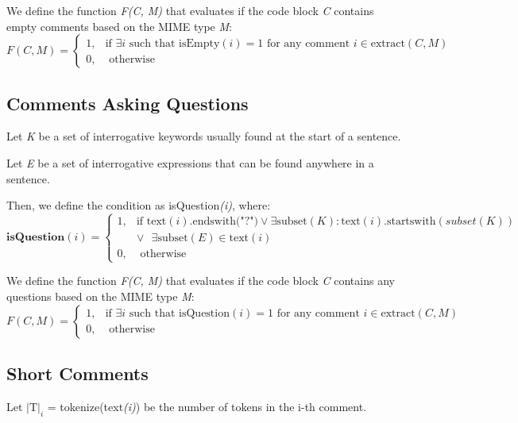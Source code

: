 \noindent We define the function \textit{F(C, M)} that evaluates if the code block \textit{C} contains empty comments based on the MIME type \textit{M}:
\begin{equation*}
	F(C, M) = \begin{cases}
		1, & \text{if } \exists i \text{ such that } \text{isEmpty}(i) = 1 \text{ for any comment } i \in \text{extract}(C, M) \\
		0, & \text{ otherwise}
	\end{cases}
\end{equation*}

\subsection{Comments Asking Questions}
Let \textit{K} be a set of interrogative keywords usually found at the start of a sentence.

\noindent Let \textit{E} be a set of interrogative expressions that can be found anywhere in a sentence.

\noindent Then, we define the condition as isQuestion\textit{(i)}, where:
\begin{equation*}
	\textbf{isQuestion}(i) = \begin{cases}
		1, & \text{if } \text{text}(i) \text{.endswith("?")} \vee \exists \text{subset}(K) : \text{text}(i) \text{.startswith}(subset(K)) \\ & \vee \text{ } \exists \text{subset}(E) \in \text{text}(i) \\
		0, & \text{ otherwise}
	\end{cases}
\end{equation*}

\noindent We define the function \textit{F(C, M)} that evaluates if the code block \textit{C} contains any questions based on the MIME type \textit{M}:
\begin{equation*}
	F(C, M) = \begin{cases}
		1, & \text{if } \exists i \text{ such that } \text{isQuestion}(i) = 1 \text{ for any comment } i \in \text{extract}(C, M) \\
		0, & \text{ otherwise}
	\end{cases}
\end{equation*}

\subsection{Short Comments}
Let $\mathrm{|T|}_{i}$ = tokenize(text\textit{(i)}) be the number of tokens in the i-th comment.

